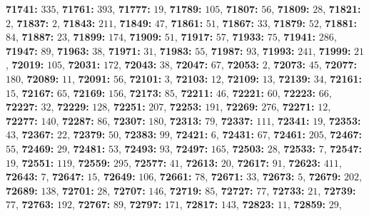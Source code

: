 \textsf{\bfseries 71741:} $335$, \textsf{\bfseries 71761:} $393$, \textsf{\bfseries 71777:} $19$, \textsf{\bfseries 71789:} $105$, \textsf{\bfseries 71807:} $56$, \textsf{\bfseries 71809:} $28$, \textsf{\bfseries 71821:} $2$, \textsf{\bfseries 71837:} $2$, \textsf{\bfseries 71843:} $211$, \textsf{\bfseries 71849:} $47$, \textsf{\bfseries 71861:} $51$, \textsf{\bfseries 71867:} $33$, \textsf{\bfseries 71879:} $52$, \textsf{\bfseries 71881:} $84$, \textsf{\bfseries 71887:} $23$, \textsf{\bfseries 71899:} $174$, \textsf{\bfseries 71909:} $51$, \textsf{\bfseries 71917:} $57$, \textsf{\bfseries 71933:} $75$, \textsf{\bfseries 71941:} $286$, \textsf{\bfseries 71947:} $89$, \textsf{\bfseries 71963:} $38$, \textsf{\bfseries 71971:} $31$, \textsf{\bfseries 71983:} $55$, \textsf{\bfseries 71987:} $93$, \textsf{\bfseries 71993:} $241$, \textsf{\bfseries 71999:} $21$, \textsf{\bfseries 72019:} $105$, \textsf{\bfseries 72031:} $172$, \textsf{\bfseries 72043:} $38$, \textsf{\bfseries 72047:} $67$, \textsf{\bfseries 72053:} $2$, \textsf{\bfseries 72073:} $45$, \textsf{\bfseries 72077:} $180$, \textsf{\bfseries 72089:} $11$, \textsf{\bfseries 72091:} $56$, \textsf{\bfseries 72101:} $3$, \textsf{\bfseries 72103:} $12$, \textsf{\bfseries 72109:} $13$, \textsf{\bfseries 72139:} $34$, \textsf{\bfseries 72161:} $15$, \textsf{\bfseries 72167:} $65$, \textsf{\bfseries 72169:} $156$, \textsf{\bfseries 72173:} $85$, \textsf{\bfseries 72211:} $46$, \textsf{\bfseries 72221:} $60$, \textsf{\bfseries 72223:} $66$, \textsf{\bfseries 72227:} $32$, \textsf{\bfseries 72229:} $128$, \textsf{\bfseries 72251:} $207$, \textsf{\bfseries 72253:} $191$, \textsf{\bfseries 72269:} $276$, \textsf{\bfseries 72271:} $12$, \textsf{\bfseries 72277:} $140$, \textsf{\bfseries 72287:} $86$, \textsf{\bfseries 72307:} $180$, \textsf{\bfseries 72313:} $79$, \textsf{\bfseries 72337:} $111$, \textsf{\bfseries 72341:} $19$, \textsf{\bfseries 72353:} $43$, \textsf{\bfseries 72367:} $22$, \textsf{\bfseries 72379:} $50$, \textsf{\bfseries 72383:} $99$, \textsf{\bfseries 72421:} $6$, \textsf{\bfseries 72431:} $67$, \textsf{\bfseries 72461:} $205$, \textsf{\bfseries 72467:} $55$, \textsf{\bfseries 72469:} $29$, \textsf{\bfseries 72481:} $53$, \textsf{\bfseries 72493:} $93$, \textsf{\bfseries 72497:} $165$, \textsf{\bfseries 72503:} $28$, \textsf{\bfseries 72533:} $7$, \textsf{\bfseries 72547:} $19$, \textsf{\bfseries 72551:} $119$, \textsf{\bfseries 72559:} $295$, \textsf{\bfseries 72577:} $41$, \textsf{\bfseries 72613:} $20$, \textsf{\bfseries 72617:} $91$, \textsf{\bfseries 72623:} $411$, \textsf{\bfseries 72643:} $7$, \textsf{\bfseries 72647:} $15$, \textsf{\bfseries 72649:} $106$, \textsf{\bfseries 72661:} $78$, \textsf{\bfseries 72671:} $33$, \textsf{\bfseries 72673:} $5$, \textsf{\bfseries 72679:} $202$, \textsf{\bfseries 72689:} $138$, \textsf{\bfseries 72701:} $28$, \textsf{\bfseries 72707:} $146$, \textsf{\bfseries 72719:} $85$, \textsf{\bfseries 72727:} $77$, \textsf{\bfseries 72733:} $21$, \textsf{\bfseries 72739:} $77$, \textsf{\bfseries 72763:} $192$, \textsf{\bfseries 72767:} $89$, \textsf{\bfseries 72797:} $171$, \textsf{\bfseries 72817:} $143$, \textsf{\bfseries 72823:} $11$, \textsf{\bfseries 72859:} $29$, 
